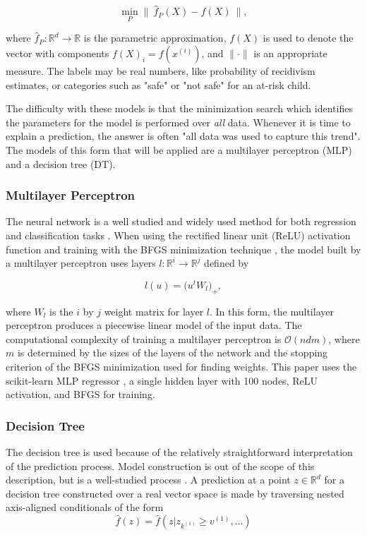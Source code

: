 \documentclass[sigconf]{acmart}
\begin{document}
$$ \min_P \bigl\|\ \hat f_P(X) - f(X)\ \bigr\|, $$

where $\hat f_P: \mathbb{R}^d \rightarrow \mathbb{R}$ is the parametric approximation, $f(X)$ is used to denote the vector with components $f(X)_i = f(x^{(i)})$, and $\| \cdot \|$ is an appropriate measure. The labels may be real numbers, like probability of recidivism estimates, or categories such as "safe" or "not safe" for an at-risk child.

The difficulty with these models is that the minimization search which identifies the parameters for the model is performed over \textit{all} data. Whenever it is time to explain a prediction, the answer is often "all data was used to capture this trend". The models of this form that will be applied are a multilayer perceptron (MLP) and a decision tree (DT).

\subsubsection{Multilayer Perceptron}

The neural network is a well studied and widely used method for both regression and classification tasks \cite{hornik1989multilayer}. When using the rectified linear unit (ReLU) activation function \cite{dahl2013improving} and training with the BFGS minimization technique \cite{moller1993scaled}, the model built by a multilayer perceptron uses layers $l : \mathbb{R}^{i} \rightarrow \mathbb{R}^{j}$ defined by

$$ l(u) = \big( u^t W_l \big)_+ ,$$

where $W_l$ is the $i$ by $j$ weight matrix for layer $l$. In this form, the multilayer perceptron produces a piecewise linear model of the input data. The computational complexity of training a multilayer perceptron is $\mathcal{O}(n d m)$, where $m$ is determined by the sizes of the layers of the network and the stopping criterion of the BFGS minimization used for finding weights. This paper uses the scikit-learn MLP regressor \cite{scikit-learn}, a single hidden layer with 100 nodes, ReLU activation, and BFGS for training.

\subsubsection{Decision Tree}

The decision tree is used because of the relatively straightforward interpretation of the prediction process. Model construction is out of the scope of this description, but is a well-studied process \cite{quinlan1986induction}. A prediction at a point $z \in \mathbb{R}^d$ for a decision tree constructed over a real vector space is made by traversing nested axis-aligned conditionals of the form
$$\hat f(z) = \hat f(z | z_{k^{(1)}} \geq v^{(1)}, \ldots) $$
\end{document}
